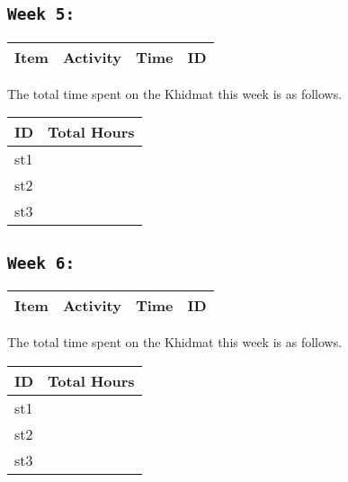 \documentclass[11pt]{article}
\begin{document}
\subsection{\texttt{Week 5: }}
\begin{center}
\begin{tabular}{|l|l|l|l|}
  \hline
  \textbf{Item} 	& \textbf{Activity} & \textbf{Time} & \textbf{ID} \\\hline
  
\end{tabular}
    
\end{center}
The total time spent on the Khidmat this week is as follows.    
\begin{center}
    
\begin{tabular}{|l|l|}
  \hline
  \textbf{ID} & \textbf{Total Hours}\\\hline
  st1 & \\\hline
  st2 & \\\hline
  st3 & \\\hline
\end{tabular}
\end{center}
\newpage
\subsection{\texttt{Week 6: }}
\begin{center}
\begin{tabular}{|l|l|l|l|}
  \hline
  \textbf{Item} 	& \textbf{Activity} & \textbf{Time} & \textbf{ID} \\\hline
  
\end{tabular}
    
\end{center}
The total time spent on the Khidmat this week is as follows.    
\begin{center}
    
\begin{tabular}{|l|l|}
  \hline
  \textbf{ID} & \textbf{Total Hours}\\\hline
  st1 & \\\hline
  st2 & \\\hline
  st3 & \\\hline
\end{tabular}
\end{center}
\newpage
\end{document}

